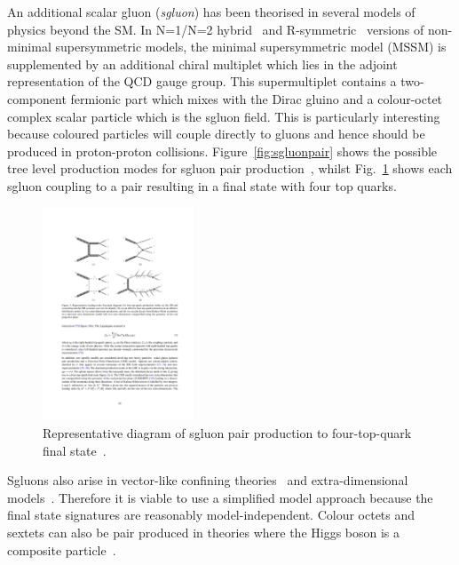 An additional scalar gluon (\emph{sgluon}) has been theorised in several models of physics beyond the SM. In N=1/N=2 hybrid~\cite{Fayet:1975yi,AlvarezGaume:1996mv} and R-symmetric~\cite{Salam:1974xa,Fayet:1974pd,Kribs:2007ac} versions of non-minimal supersymmetric models, the minimal supersymmetric model (MSSM) is supplemented by an additional chiral multiplet which lies in the adjoint representation of the QCD gauge group. This supermultiplet contains a two-component fermionic part which mixes with the Dirac gluino and a colour-octet complex scalar particle which is the sgluon field. This is particularly interesting because coloured particles will couple directly to gluons and hence should be produced in proton-proton collisions. Figure~\ref{fig:sgluonpair} shows the possible tree level production modes for sgluon pair production~\cite{Calvet:2012rk}, whilst Fig.~\ref{fig:sgluontttt} shows each sgluon coupling to a \ttbar pair resulting in a final state with four top quarks.
\begin{figure}[ht!]
\begin{center}
    \includegraphics[width=0.4\textwidth]{images/Theory/sgluontotttt.pdf}
    \caption{Representative diagram of sgluon pair production to four-top-quark final state~\cite{Aad:2015kqa}.}
    \label{fig:sgluontttt}
\end{center}
\end{figure}
Sgluons also arise in vector-like confining theories~\cite{Kilic:2009mi} and extra-dimensional models~\cite{Burdman:2006gy}. Therefore it is viable to use a simplified model approach because the final state signatures are reasonably model-independent. Colour octets and sextets can also be pair produced in theories where the Higgs boson is a composite particle~\cite{Cacciapaglia2015}.






